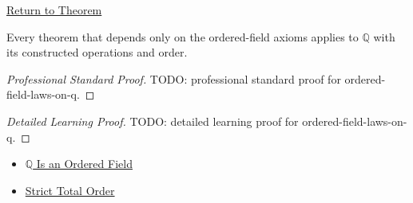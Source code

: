 \newpage
{}
\label{prf:ordered-field-laws-on-q}

\begin{remark*}[Return]
\hyperref[cor:ordered-field-laws-on-q]{Return to Theorem}
\end{remark*}

\begin{corollary*}
Every theorem that depends only on the ordered-field axioms applies to
$\mathbb{Q}$ with its constructed operations and order.
\end{corollary*}

\begin{proof}[Professional Standard Proof]
\LRAProofBodyStart
TODO: professional standard proof for ordered-field-laws-on-q.
\end{proof}

\begin{proof}[Detailed Learning Proof]
\LRAProofBodyStart
TODO: detailed learning proof for ordered-field-laws-on-q.
\end{proof}

\begin{remark*}
\end{remark*}

\begin{dependencies}
\begin{itemize}
  \item \hyperref[thm:q-is-an-ordered-field]{$\mathbb{Q}$ Is an Ordered Field}
  \item \hyperref[def:strict-total-order]{Strict Total Order}
\end{itemize}
\end{dependencies}

\clearpage
